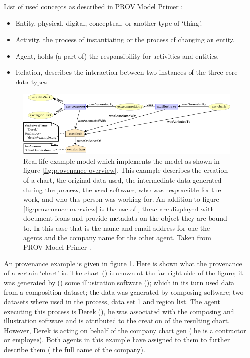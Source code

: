 List of used concepts as described in PROV Model Primer \cite{dsp8gil}:

\begin{itemize}
	\item Entity, physical, digital, conceptual, or another type of `thing'.
	\item Activity, the process of instantiating or the process of changing an entity.
	\item Agent, holds (a part of) the responsibility for activities and entities.
	\item Relation, describes the interaction between two instances of the three core data types.
\end{itemize}

\begin{figure}[!b]
	\centering
	\includegraphics[width=1.0\linewidth]{images/provenance-large-schema}
	\caption{
		Real life example model which implements the model as shown in figure \ref{fig:provenance-overview}.
		This example describes the creation of a chart, the original data used, the intermediate data generated during the process, the used software, who was responsible for the work, and who this person was working for.
		An addition to figure \ref{fig:provenance-overview} is the use of \attributes{}, these are displayed with document icons and provide metadata on the object they are bound to.
		In this case that is the name and email address for one the agents and the company name for the other agent.
		Taken from PROV Model Primer \cite{dsp8gil}.
		}
	\label{fig:provenance-large-schema}
\end{figure}

An provenance example is given in figure \ref{fig:provenance-large-schema}.
Here is shown what the provenance of a certain `chart' is.
The chart (\entity) is shown at the far right side of the figure; it was generated by (\relation) some illustration software (\activity); which in its turn used data from a composition dataset; the data was generated by composing software; two datasets where used in the process, data set 1 and region list.
The agent executing this process is Derek (\agent), he was associated with the composing and illustration software and is attributed to the creation of the resulting chart.
However, Derek is acting on behalf of the company chart gen (\eg{} he is a contractor or employee).
Both agents in this example have \attributes{} assigned to them to further describe them (\eg{} the full name of the company).

